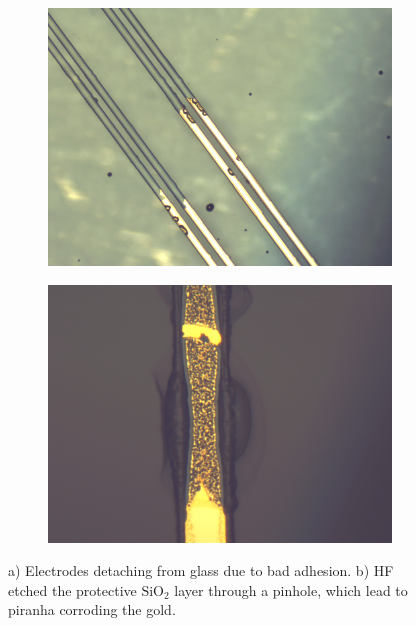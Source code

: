 \documentclass[final]{jyflluk}
\begin{document}
 \begin{figure}
    \centering
    \begin{subfigure}[ht]{0.48\textwidth}
        \centering
        \includegraphics[width=\linewidth]{optical/eledetach.png} 
        \caption{} \label{fig:lileee}
    \end{subfigure}
    \hfill
    \begin{subfigure}[ht]{0.48\textwidth}
        \centering
        \includegraphics[width=\linewidth]{optical/piranha_ate.png} 
        \caption{} \label{fig:lellqqq}
    \end{subfigure}
    \caption{a) Electrodes detaching from glass due to bad adhesion. b) HF etched the protective $\mathrm{SiO_2}$ layer through a pinhole, which lead to piranha corroding the gold.} \label{fig:eleproblem}
\end{figure}  
\end{document}
